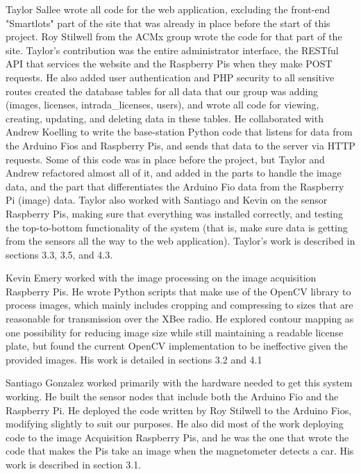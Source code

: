 \documentclass[11pt, oneside, fullpage, doublespace]{article}
\begin{document}
Taylor Sallee wrote all code for the web application, excluding the front-end "Smartlots" part of the site that was already in place before the start of this project. Roy Stilwell from the ACMx group wrote the code for that part of the site. Taylor's contribution was the entire administrator interface, the RESTful API that services the website and the Raspberry Pis when they make POST requests. He also added user authentication and PHP security to all sensitive routes created the database tables for all data that our group was adding (images, licenses, intrada\_licenses, users), and wrote all code for viewing, creating, updating, and deleting data in these tables. He collaborated with Andrew Koelling to write the base-station Python code that listens for data from the Arduino Fios and Raspberry Pis, and sends that data to the server via HTTP requests. Some of this code was in place before the project, but Taylor and Andrew refactored almost all of it, and added in the parts to handle the image data, and the part that differentiates the Arduino Fio data from the Raspberry Pi (image) data. Taylor also worked with Santiago and Kevin on the sensor Raspberry Pis, making sure that everything was installed correctly, and testing the top-to-bottom functionality of the system (that is, make sure data is getting from the sensors all the way to the web application). Taylor's work is described in sections 3.3, 3.5, and 4.3.

Kevin Emery worked with the image processing on the image acquisition Raspberry Pis. He wrote Python scripts that make use of the OpenCV library to process images, which mainly includes cropping and compressing to sizes that are reasonable for transmission over the XBee radio. He explored contour mapping as one possibility for reducing image size while still maintaining a readable license plate, but found the current OpenCV implementation to be ineffective given the provided images. His work is detailed in sections 3.2 and 4.1

Santiago Gonzalez worked primarily with the hardware needed to get this system working. He built the sensor nodes that include both the Arduino Fio and the Raspberry Pi. He deployed the code written by Roy Stilwell to the Arduino Fios, modifying slightly to suit our purposes. He also did most of the work deploying code to the image Acquisition Raspberry Pis, and he was the one that wrote the code that makes the Pis take an image when the magnetometer detects a car. His work is described in section 3.1.
\end{document}
